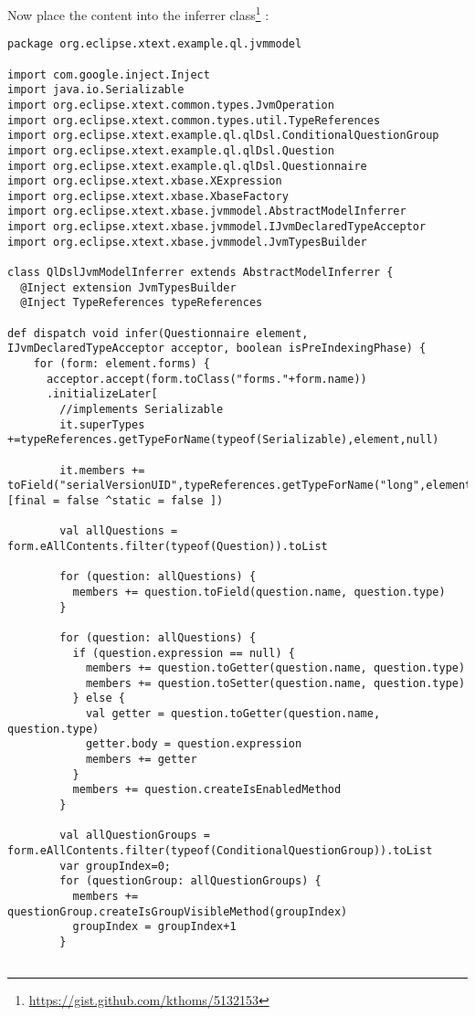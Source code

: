 Now place the content into the inferrer class\footnote{\url{https://gist.github.com/kthoms/5132153}}
: 
\begin{lstlisting}[language=Xtend]
package org.eclipse.xtext.example.ql.jvmmodel

import com.google.inject.Inject
import java.io.Serializable
import org.eclipse.xtext.common.types.JvmOperation
import org.eclipse.xtext.common.types.util.TypeReferences
import org.eclipse.xtext.example.ql.qlDsl.ConditionalQuestionGroup
import org.eclipse.xtext.example.ql.qlDsl.Question
import org.eclipse.xtext.example.ql.qlDsl.Questionnaire
import org.eclipse.xtext.xbase.XExpression
import org.eclipse.xtext.xbase.XbaseFactory
import org.eclipse.xtext.xbase.jvmmodel.AbstractModelInferrer
import org.eclipse.xtext.xbase.jvmmodel.IJvmDeclaredTypeAcceptor
import org.eclipse.xtext.xbase.jvmmodel.JvmTypesBuilder

class QlDslJvmModelInferrer extends AbstractModelInferrer {
  @Inject extension JvmTypesBuilder
  @Inject TypeReferences typeReferences

def dispatch void infer(Questionnaire element, IJvmDeclaredTypeAcceptor acceptor, boolean isPreIndexingPhase) {
    for (form: element.forms) {
      acceptor.accept(form.toClass("forms."+form.name))
      .initializeLater[
        //implements Serializable
        it.superTypes +=typeReferences.getTypeForName(typeof(Serializable),element,null)

        it.members += toField("serialVersionUID",typeReferences.getTypeForName("long",element),[final = false ^static = false ])

        val allQuestions = form.eAllContents.filter(typeof(Question)).toList
        
        for (question: allQuestions) {
          members += question.toField(question.name, question.type)
        }

        for (question: allQuestions) {
          if (question.expression == null) {
            members += question.toGetter(question.name, question.type)
            members += question.toSetter(question.name, question.type)
          } else {
            val getter = question.toGetter(question.name, question.type)
            getter.body = question.expression
            members += getter
          }
          members += question.createIsEnabledMethod
        }

        val allQuestionGroups = form.eAllContents.filter(typeof(ConditionalQuestionGroup)).toList
        var groupIndex=0;
        for (questionGroup: allQuestionGroups) {
          members += questionGroup.createIsGroupVisibleMethod(groupIndex)
          groupIndex = groupIndex+1
        }


\end{lstlisting}
